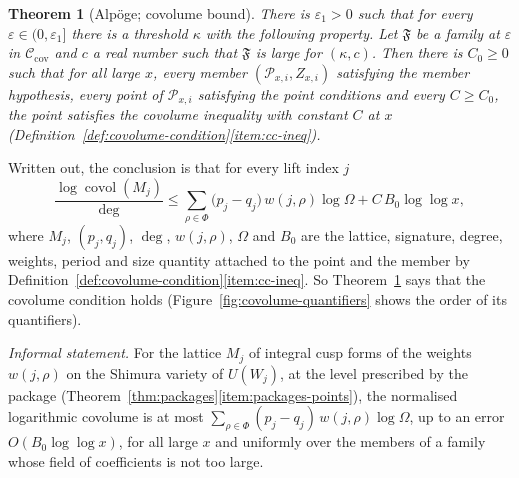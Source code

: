 \documentclass[11pt]{amsbook}
\theoremstyle{plain}
\newtheorem{theorem}{Theorem}[section]
\theoremstyle{definition}
\theoremstyle{remark}
\numberwithin{equation}{section}
\numberwithin{figure}{chapter}
\numberwithin{table}{chapter}
\newcommand{\eps}{\varepsilon}
\newcommand{\Fam}{\mathfrak{F}}
\begin{document}
\begin{theorem}[Alp\"oge; covolume bound]\label{thm:covolume}
There is $\eps_1>0$ such that for every
$\eps\in(0,\eps_1]$ there is a threshold $\kappa$ with the following
property. Let $\Fam$ be a family at $\eps$ in $\mathcal
C_{\mathrm{cov}}$ and $c$ a real number such that $\Fam$ is large for
$(\kappa,c)$. Then there is $C_0\ge0$ such that for all large $x$,
every member $(\mathcal P_{x,i},Z_{x,i})$ satisfying the member
hypothesis, every point of $\mathcal P_{x,i}$ satisfying the point
conditions and every $C\ge C_0$, the point satisfies the covolume
inequality with constant $C$ at $x$
(Definition~\ref{def:covolume-condition}\ref{item:cc-ineq}).
\end{theorem}

\noindent Written out, the conclusion is that for every lift index $j$
\[
\frac{\log\operatorname{covol}(M_j)}{\deg}\le\sum_{\rho\in\Phi}
\bigl(p_j-q_j\bigr)\,w(j,\rho)\log\Omega+C\,B_0\log\log x,
\]
where $M_j$, $(p_j,q_j)$, $\deg$, $w(j,\rho)$, $\Omega$ and $B_0$ are
the lattice, signature, degree, weights, period and size quantity
attached to the point and the member by
Definition~\ref{def:covolume-condition}\ref{item:cc-ineq}. So
Theorem~\ref{thm:covolume} says that the covolume condition holds
(Figure~\ref{fig:covolume-quantifiers} shows the order of its quantifiers).

\noindent \emph{Informal statement.} For the lattice $M_j$ of
integral cusp forms of the weights $w(j,\rho)$ on the Shimura variety
of $U(W_j)$, at the level prescribed by the package
(Theorem~\ref{thm:packages}\ref{item:packages-points}), the normalised
logarithmic covolume is at most $\sum_{\rho\in\Phi}(p_j-q_j)\,
w(j,\rho)\log\Omega$, up to an error $O(B_0\log\log x)$, for all
large $x$ and uniformly over the members of a family whose field of
coefficients is not too large.
\begin{figure}[tbp]
\centering

\end{figure}
\end{document}
